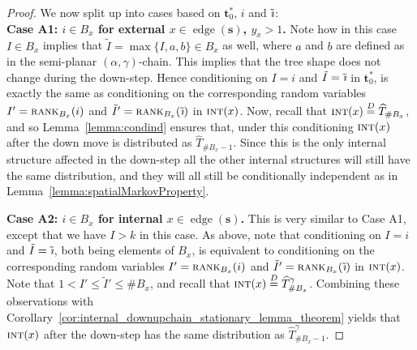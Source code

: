 \documentclass[a4paper, final]{amsart}
\theoremstyle{plain}
\theoremstyle{definition}
\newcommand{\tree}[1][t]{\boldsymbol{#1}}
\newcommand{\That}[1][T]{\widehat{#1}}
\DeclareMathOperator{\edge}{edge}
\DeclareMathOperator{\intstruct}{\textsc{int}}
\DeclareMathOperator{\rank}{\textsc{rank}}
\DeclareMathOperator{\tildei}{\tilde{\textit{\i}}}
\newcommand{\deq}{\stackrel{D}{=}}
\begin{document}
\begin{proof}
  We now split up into cases based on $\tree_0^*$, $i$ and $\tildei$: \\

  \textbf{Case A1: $i \in B_x$ for external $x \in \edge (\tree[s])$, $y_x > 1$.}
  Note how in this case $I \in B_x$ implies that $\tilde{I} = \max \{ I, a, b \} \in B_x$ as well, where $a$ and $b$ are defined as in the semi-planar $(\alpha, \gamma)$-chain.
  This implies that the tree shape does not change during the down-step.  
  Hence conditioning on $I = i$ and $\tilde{I} = \tildei$ in $\tree_0^*$, is exactly the same as conditioning on the corresponding random variables $I' = \rank_{B_x}(i)$ and $\tilde{I}' = \rank_{B_x}(\tildei)$ in $\intstruct (x)$.
  Now, recall that {$\intstruct (x) \deq \That_{\# B_x}$}, and so Lemma~\ref{lemma:condind} ensures that, under this conditioning $\intstruct (x)$ after the down move is distributed as $\That_{\# B_x - 1}$.
  Since this is the only internal structure affected in the down-step all the other internal structures will still have the same distribution, and they will all still be conditionally independent as in Lemma~\ref{lemma:spatialMarkovProperty}.

  \textbf{Case A2: $i \in B_x$ for internal $x \in \edge (\tree[s])$.}
  This is very similar to Case A1, except that we have $I > k$ in this case.
  As above, note that conditioning on $I = i$ and $\tilde{I} = \tildei$, both being elements of $B_x$, is equivalent to conditioning on the corresponding random variables $I' = \rank_{B_x}(i)$ and $\tilde{I}' = \rank_{B_x}(\tildei)$ in $\intstruct (x)$.
  Note that $1 < I' \leq \tilde{I}' \leq \# B_x$, and recall that $\intstruct (x) \deq \That_{\# B_x}^\gamma$.
  Combining these observations with Corollary~\ref{cor:internal_downupchain_stationary_lemma_theorem} yields that $\intstruct (x)$ after the down-step has the same distribution as $\That_{\# B_x - 1}^\gamma$.


\end{proof}
\end{document}
